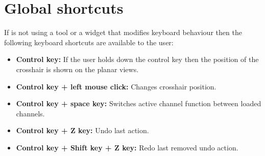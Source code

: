 \section{Global shortcuts}

If \espina{} is not using a tool or a widget that modifies keyboard behaviour then the following keyboard shortcuts are available to the user:
\begin{itemize}
\item \textbf{Control key:} If the user holds down the control key then the position of the crosshair is shown on the planar views.
\item \textbf{Control key + left mouse click:} Changes crosshair position.
\item \textbf{Control key + space key:} Switches active channel function between loaded channels.
\item \textbf{Control key + Z key:} Undo last action.
\item \textbf{Control key + Shift key + Z key:} Redo last removed undo action.

\end{itemize}
